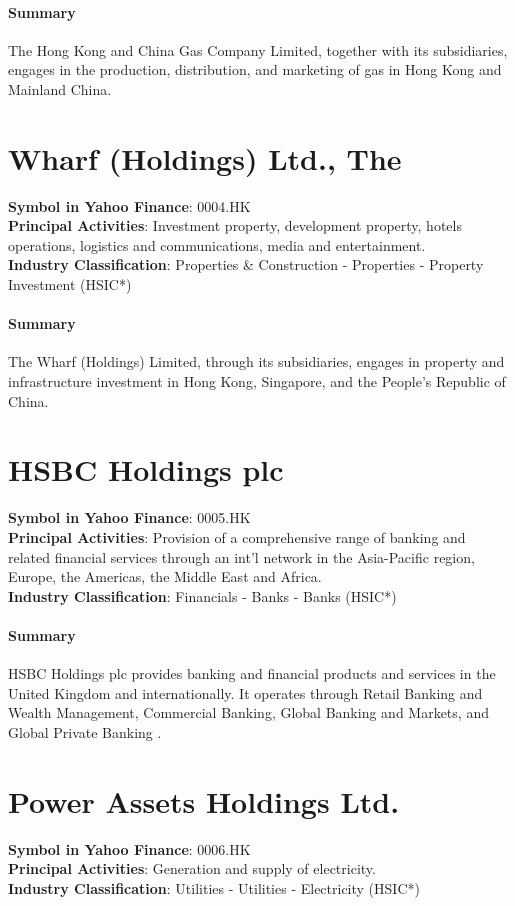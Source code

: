 \paragraph{Summary}
The Hong Kong and China Gas Company Limited, together with its subsidiaries, engages in the production, distribution, and marketing of gas in Hong Kong and Mainland China.


\section{Wharf (Holdings) Ltd., The}
\textbf{Symbol in Yahoo Finance}: 0004.HK\\
\textbf{Principal Activities}: Investment property, development property, hotels operations, logistics and communications, media and entertainment.\\
\textbf{Industry Classification}: Properties \& Construction - Properties - Property Investment (HSIC*)
\paragraph{Summary}
The Wharf (Holdings) Limited, through its subsidiaries, engages in property and infrastructure investment in Hong Kong, Singapore, and the People's Republic of China.


\section{HSBC Holdings plc}
\textbf{Symbol in Yahoo Finance}: 0005.HK\\
\textbf{Principal Activities}: Provision of a comprehensive range of banking and related financial services through an int'l network in the Asia-Pacific region, Europe, the Americas, the Middle East and Africa.\\
\textbf{Industry Classification}: Financials - Banks - Banks (HSIC*)
\paragraph{Summary}
HSBC Holdings plc provides banking and financial products and services in the United Kingdom and internationally. It operates through Retail Banking and Wealth Management, Commercial Banking, Global Banking and Markets, and Global Private Banking .


\section{Power Assets Holdings Ltd.}
\textbf{Symbol in Yahoo Finance}: 0006.HK\\
\textbf{Principal Activities}: Generation and supply of electricity.\\
\textbf{Industry Classification}: Utilities - Utilities - Electricity (HSIC*)
